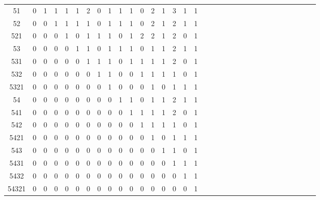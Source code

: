 \begin{tabular}{|c|c|c|c|c|c|c|c|c|c|c|c|c|c|c|c|c|c|c|c|c|c|c|c|c|c|c|c|c|c|c|c|c|}
51    & 0 & 1  & 1  & 1   & 1  & 2   & 0   & 1    & 1  & 1   & 0   & 2    & 1   & 3    & 1    & 1\\
52    & 0 & 0  & 1  & 1   & 1  & 1   & 0   & 1    & 1  & 1   & 0   & 2    & 1   & 2    & 1    & 1\\
521   & 0 & 0  & 0  & 1   & 0  & 1   & 1   & 1    & 0  & 1   & 2   & 2    & 1   & 2    & 0    & 1\\
53    & 0 & 0  & 0  & 0   & 1  & 1   & 0   & 1    & 1  & 1   & 0   & 1    & 1   & 2    & 1    & 1\\
531   & 0 & 0  & 0  & 0   & 0  & 1   & 1   & 1    & 0  & 1   & 1   & 1    & 1   & 2    & 0    & 1\\
532   & 0 & 0  & 0  & 0   & 0  & 0   & 1   & 1    & 0  & 0   & 1   & 1    & 1   & 1    & 0    & 1\\
5321  & 0 & 0  & 0  & 0   & 0  & 0   & 0   & 1    & 0  & 0   & 0   & 1    & 0   & 1    & 1    & 1\\
54    & 0 & 0  & 0  & 0   & 0  & 0   & 0   & 0    & 1  & 1   & 0   & 1    & 1   & 2    & 1    & 1\\
541   & 0 & 0  & 0  & 0   & 0  & 0   & 0   & 0    & 0  & 1   & 1   & 1    & 1   & 2    & 0    & 1\\
542   & 0 & 0  & 0  & 0   & 0  & 0   & 0   & 0    & 0  & 0   & 1   & 1    & 1   & 1    & 0    & 1\\
5421  & 0 & 0  & 0  & 0   & 0  & 0   & 0   & 0    & 0  & 0   & 0   & 1    & 0   & 1    & 1    & 1\\
543   & 0 & 0  & 0  & 0   & 0  & 0   & 0   & 0    & 0  & 0   & 0   & 0    & 1   & 1    & 0    & 1\\
5431  & 0 & 0  & 0  & 0   & 0  & 0   & 0   & 0    & 0  & 0   & 0   & 0    & 0   & 1    & 1    & 1\\
5432  & 0 & 0  & 0  & 0   & 0  & 0   & 0   & 0    & 0  & 0   & 0   & 0    & 0   & 0    & 1    & 1\\
54321 & 0 & 0  & 0  & 0   & 0  & 0   & 0   & 0    & 0  & 0   & 0   & 0    & 0   & 0    & 0    & 1\\
\hline
\end{tabular}
\\
\vspace*{1cm}
\\\hspace*{-0.6in}
